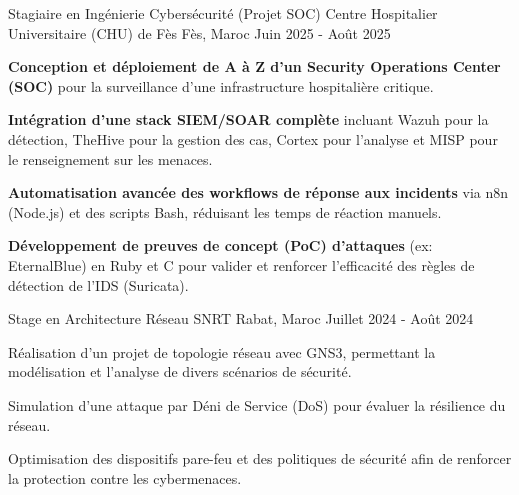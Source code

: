 \begin{cventries}

  \cventry
  {Stagiaire en Ingénierie Cybersécurité (Projet SOC)} %
  {Centre Hospitalier Universitaire (CHU) de Fès} %
  {Fès, Maroc} %
  {Juin 2025 - Août 2025} %
  {
    \begin{cvitems}
      \item {
                  \textbf{Conception et déploiement de A à Z d'un Security Operations Center (SOC)} pour la surveillance d'une infrastructure hospitalière critique.}
      \item {
                  \textbf{Intégration d'une stack SIEM/SOAR complète} incluant Wazuh pour la détection, TheHive pour la gestion des cas, Cortex pour l'analyse et MISP pour le renseignement sur les menaces.}
      \item {
                  \textbf{Automatisation avancée des workflows de réponse aux incidents} via n8n (Node.js) et des scripts Bash, réduisant les temps de réaction manuels.}
      \item {
                  \textbf{Développement de preuves de concept (PoC) d'attaques} (ex: EternalBlue) en Ruby et C pour valider et renforcer l'efficacité des règles de détection de l'IDS (Suricata).}
    \end{cvitems}
  }

  \cventry
  {Stage en Architecture Réseau} %
  {SNRT} %
  {Rabat, Maroc} %
  {Juillet 2024 - Août 2024} %
  {
    \begin{cvitems} %
      \item {Réalisation d'un projet de topologie réseau avec GNS3, permettant la modélisation et l'analyse de divers scénarios de sécurité.}
      \item {Simulation d'une attaque par Déni de Service (DoS) pour évaluer la résilience du réseau.}
      \item {Optimisation des dispositifs pare-feu et des politiques de sécurité afin de renforcer la protection contre les cybermenaces.}
    \end{cvitems}
  }
\end{cventries}


